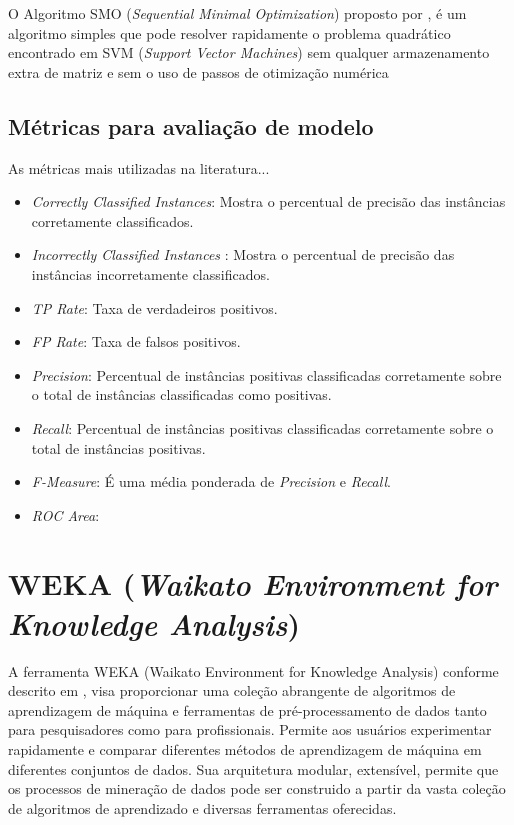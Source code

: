 \documentclass[
	12pt,				%
	openright,			%
	oneside,	
	a4paper,				%
	english,				%
	brazil				%
]{abntex2/abntex2} %
\begin{document}
	O Algoritmo SMO (\textit{Sequential Minimal Optimization}) proposto por \cite{platt:1998},  é um algoritmo simples que pode resolver rapidamente o problema quadrático encontrado em SVM (\textit{Support Vector Machines}) sem qualquer armazenamento extra de matriz e sem o uso de passos de otimização numérica


	\subsection{Métricas para avaliação de modelo}
	
	As métricas mais utilizadas na literatura...
	
		\begin{itemize}
			\item \textit{Correctly Classified Instances}: Mostra o percentual de precisão das instâncias corretamente classificados.
			\item \textit{Incorrectly Classified Instances} : Mostra o percentual de precisão das instâncias incorretamente classificados.
			\item \textit{TP Rate}: Taxa de verdadeiros positivos.
			\item \textit{FP Rate}: Taxa de falsos positivos.
			\item \textit{Precision}: Percentual de instâncias positivas classificadas corretamente sobre o total de instâncias classificadas como positivas.
			\item \textit{Recall}: Percentual de instâncias positivas classificadas corretamente sobre o total de instâncias positivas.
			\item \textit{F-Measure}: É uma média ponderada de \textit{Precision} e \textit{Recall}.
			\item \textit{ROC Area}: 
		\end{itemize}

	\section{WEKA (\textit{Waikato Environment for Knowledge Analysis})}
	
	A ferramenta WEKA (Waikato Environment for Knowledge Analysis)  conforme descrito em \cite{hall:2009}, visa proporcionar uma coleção abrangente de algoritmos de aprendizagem de máquina e ferramentas de pré-processamento de dados tanto para pesquisadores como para profissionais. Permite aos usuários experimentar rapidamente e comparar diferentes métodos de aprendizagem de máquina em diferentes conjuntos de dados. Sua arquitetura modular, extensível, permite que os processos de mineração de dados pode ser construido a partir da vasta coleção de algoritmos de aprendizado e diversas ferramentas oferecidas.
		
\end{document}

